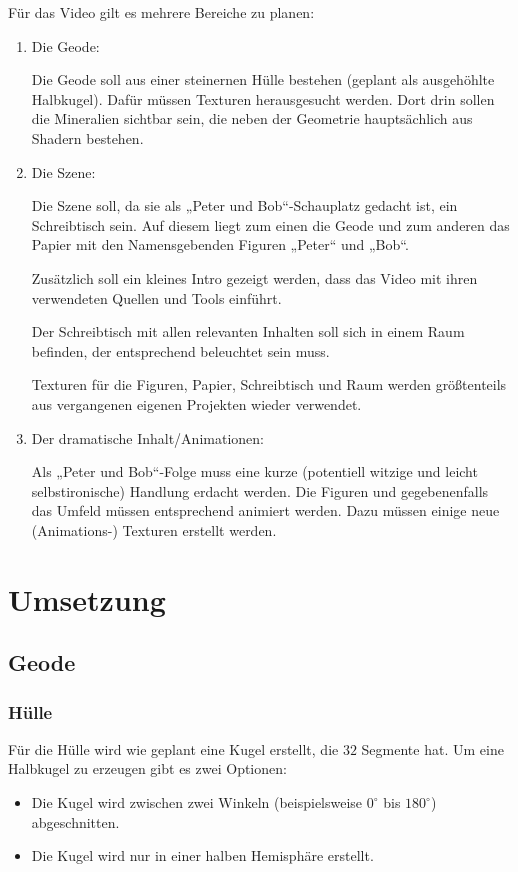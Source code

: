 \documentclass{scrreprt}
\begin{document}
Für das Video gilt es mehrere Bereiche zu planen:
\begin{enumerate}
\item Die Geode:

Die Geode soll aus einer steinernen Hülle bestehen (geplant als ausgehöhlte Halbkugel). Dafür müssen Texturen herausgesucht werden. Dort drin sollen die Mineralien sichtbar sein, die neben der Geometrie hauptsächlich aus Shadern bestehen.
\item Die Szene:

Die Szene soll, da sie als „Peter und Bob“-Schauplatz gedacht ist, ein Schreibtisch sein. Auf diesem liegt zum einen die Geode und zum anderen das Papier mit den Namensgebenden Figuren „Peter“ und „Bob“.

Zusätzlich soll ein kleines Intro gezeigt werden, dass das Video mit ihren verwendeten Quellen und Tools einführt.

Der Schreibtisch mit allen relevanten Inhalten soll sich in einem Raum befinden, der entsprechend beleuchtet sein muss.

Texturen für die Figuren, Papier, Schreibtisch und Raum werden größtenteils aus vergangenen eigenen Projekten wieder verwendet.
\item Der dramatische Inhalt/Animationen:

Als „Peter und Bob“-Folge muss eine kurze (potentiell witzige und leicht selbstironische) Handlung erdacht werden. Die Figuren und gegebenenfalls das Umfeld müssen entsprechend animiert werden. Dazu müssen einige neue (Animations-) Texturen erstellt werden.
\end{enumerate}

\section{Umsetzung}

\subsection{Geode}
\subsubsection{Hülle}

Für die Hülle wird wie geplant eine Kugel erstellt, die $32$ Segmente hat. Um eine Halbkugel zu erzeugen gibt es zwei Optionen:
\begin{itemize}
\item Die Kugel wird zwischen zwei Winkeln (beispielsweise $0^\circ$ bis $180^\circ$) abgeschnitten.
\item Die Kugel wird nur in einer halben Hemisphäre erstellt.
\end{itemize}
\end{document}
